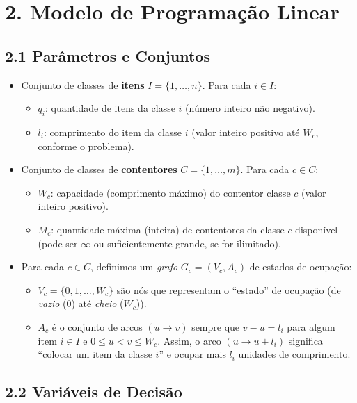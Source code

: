 \documentclass[a4paper,12pt]{article}
\begin{document}
\section*{2. Modelo de Programação Linear}

\subsection*{2.1 Parâmetros e Conjuntos}

\begin{itemize}
  \item Conjunto de classes de \textbf{itens} $I = \{1,\dots,n\}$. Para cada $i \in I$:
  \begin{itemize}
    \item $q_i$: quantidade de itens da classe $i$ (número inteiro não negativo).
    \item $l_i$: comprimento do item da classe $i$ (valor inteiro positivo até $W_c$, conforme o problema).
  \end{itemize}

  \item Conjunto de classes de \textbf{contentores} $C = \{1,\dots,m\}$. Para cada $c \in C$:
  \begin{itemize}
    \item $W_c$: capacidade (comprimento máximo) do contentor classe $c$ (valor inteiro positivo).
    \item $M_c$: quantidade máxima (inteira) de contentores da classe $c$ disponível 
    (pode ser $\infty$ ou suficientemente grande, se for ilimitado).
  \end{itemize}

  \item Para cada $c \in C$, definimos um \emph{grafo} $G_c = (V_c, A_c)$ de estados de ocupação:
  \begin{itemize}
    \item $V_c = \{0,1,\dots, W_c\}$ são nós que representam o “estado” de ocupação (de \emph{vazio} (0) até \emph{cheio} ($W_c$)).
    \item $A_c$ é o conjunto de arcos $(u\to v)$ sempre que $v-u = l_i$ para algum item $i \in I$ 
    e $0 \leq u < v \leq W_c$. 
    Assim, o arco $(u \to u+l_i)$ significa “colocar um item da classe $i$” 
    e ocupar mais $l_i$ unidades de comprimento.
  \end{itemize}
\end{itemize}

\subsection*{2.2 Variáveis de Decisão}
\end{document}
